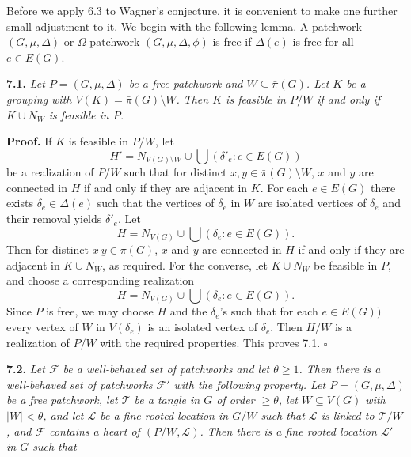 
Before we apply 6.3 to Wagner's conjecture, it is convenient to make one further small adjustment to it. We begin with the following lemma. A patchwork $(G, \mu, \Delta)$ or $\Omega$-patchwork $(G, \mu, \Delta, \phi)$ is free if $\Delta(e)$ is free for all $e \in E(G)$.

\textbf{7.1.} \textit{Let $P = (G, \mu, \Delta)$ be a free patchwork and $W \subseteq \bar{\pi}(G)$. Let $K$ be a grouping with $V(K) = \bar{\pi}(G) \setminus W$. Then $K$ is feasible in $P/W$ if and only if $K \cup N_W$ is feasible in $P$.}

\textbf{Proof.} If $K$ is feasible in $P/W$, let
\begin{equation*}
H' = N_{V(G) \setminus W} \cup \bigcup(\delta'_e : e \in E(G))
\end{equation*}
be a realization of $P/W$ such that for distinct $x, y \in \bar{\pi}(G) \setminus W$, $x$ and $y$ are connected in $H$ if and only if they are adjacent in $K$. For each $e \in E(G)$ there exists $\delta_e \in \Delta(e)$ such that the vertices of $\delta_e$ in $W$ are isolated vertices of $\delta_e$ and their removal yields $\delta'_e$. Let
\begin{equation*}
H = N_{V(G)} \cup \bigcup(\delta_e : e \in E(G)).
\end{equation*}
Then for distinct $x \ y \in \bar{\pi}(G)$, $x$ and $y$ are connected in $H$ if and only if they are adjacent in $K \cup N_W$, as required. For the converse, let $K \cup N_W$ be feasible in $P$, and choose a corresponding realization
\begin{equation*}
H = N_{V(G)} \cup \bigcup(\delta_e : e \in E(G)).
\end{equation*}
Since $P$ is free, we may choose $H$ and the $\delta_e$'s such that for each $e \in E(G))$ every vertex of $W$ in $V(\delta_e)$ is an isolated vertex of $\delta_e$. Then $H/W$ is a realization of $P/W$ with the required properties. This proves 7.1. $\square$

\textbf{7.2.} \textit{Let $\mathcal{F}$ be a well-behaved set of patchworks and let $\theta \ge 1$. Then there is a well-behaved set of patchworks $\mathcal{F}'$ with the following property. Let $P = (G, \mu, \Delta)$ be a free patchwork, let $\mathcal{T}$ be a tangle in $G$ of order $\ge \theta$, let $W \subseteq V(G)$ with $|W| < \theta$, and let $\mathcal{L}$ be a fine rooted location in $G/W$ such that $\mathcal{L}$ is linked to $\mathcal{T}/W$, and $\mathcal{F}$ contains a heart of $(P/W, \mathcal{L})$. Then there is a fine rooted location $\mathcal{L}'$ in $G$ such that}

